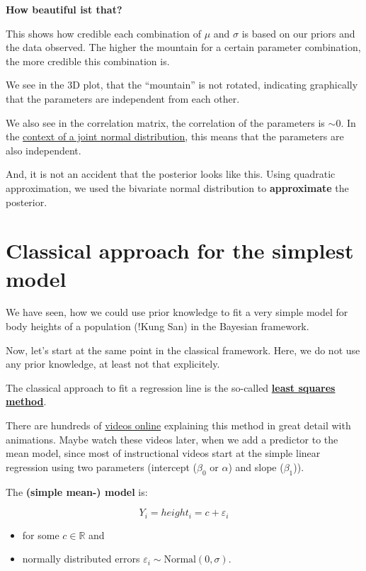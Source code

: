 \documentclass[
]{book}
\providecommand{\tightlist}{%
  \setlength{\itemsep}{0pt}\setlength{\parskip}{0pt}}
\begin{document}
\textbf{How beautiful ist that?}

This shows how credible each combination of \(\mu\) and \(\sigma\) is based on our priors and the data observed.
The higher the mountain for a certain parameter combination, the more credible this combination is.

We see in the 3D plot, that the ``mountain'' is not rotated, indicating
graphically that the parameters are independent from each other.

We also see in the correlation matrix, the correlation of the parameters is \(\sim 0\).
In the \href{https://en.wikipedia.org/wiki/Correlation\#Correlation_and_independence}{context of a joint normal distribution},
this means that the parameters are also independent.

And, it is not an accident that the posterior looks like this. Using quadratic approximation,
we used the bivariate normal distribution to \textbf{approximate} the posterior.

\section{Classical approach for the simplest model}\label{classical-approach-for-the-simplest-model}

We have seen, how we could use prior knowledge to fit a very simple model
for body heights of a population (!Kung San) in the Bayesian framework.

Now, let's start at the same point in the classical framework.
Here, we do not use any prior knowledge, at least not that explicitely.

The classical approach to fit a regression line is the so-called
\textbf{\href{https://en.wikipedia.org/wiki/Least_squares}{least squares method}}.

There are hundreds of \href{https://www.youtube.com/results?search_query=linear+regression}{videos online}
explaining this method in great detail
with animations. Maybe watch these videos later, when we add a predictor to the mean model,
since most of instructional videos start at the simple linear regression using
two parameters (intercept (\(\beta_0\) or \(\alpha\)) and slope (\(\beta_1\))).

The \textbf{(simple mean-) model} is:

\[ Y_i = height_i = c + \varepsilon_i \]

\begin{itemize}
\tightlist
\item
  for some \(c \in \mathbb{R}\) and
\item
  normally distributed errors \(\varepsilon_i \sim \text{Normal}(0, \sigma)\).
\end{itemize}
\end{document}
